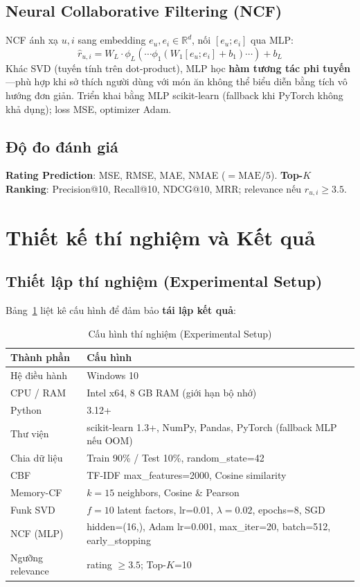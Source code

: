 \documentclass[11pt]{article}
\begin{document}
\subsection{Neural Collaborative Filtering (NCF)}
NCF ánh xạ $u, i$ sang embedding $e_u, e_i \in \mathbb{R}^d$, nối $[e_u; e_i]$ qua MLP:
\begin{equation}
    \hat{r}_{u,i} = W_L \cdot \phi_L(\cdots \phi_1(W_1 [e_u; e_i] + b_1) \cdots) + b_L
\end{equation}
Khác SVD (tuyến tính trên dot-product), MLP học \textbf{hàm tương tác phi tuyến}---phù hợp khi sở thích người dùng với món ăn không thể biểu diễn bằng tích vô hướng đơn giản. Triển khai bằng MLP scikit-learn (fallback khi PyTorch không khả dụng); loss MSE, optimizer Adam.

\subsection{Độ đo đánh giá}
\textbf{Rating Prediction}: MSE, RMSE, MAE, NMAE ($=\text{MAE}/5$). \textbf{Top-$K$ Ranking}: Precision@10, Recall@10, NDCG@10, MRR; relevance nếu $r_{u,i} \geq 3.5$.

\section{Thiết kế thí nghiệm và Kết quả}
\label{sec:exp}

\subsection{Thiết lập thí nghiệm (Experimental Setup)}
Bảng~\ref{tab:setup} liệt kê cấu hình để đảm bảo \textbf{tái lập kết quả}:

\begin{table}[t]
\centering
\caption{Cấu hình thí nghiệm (Experimental Setup)}
\label{tab:setup}
\small
\begin{tabular}{ll}
\toprule
\textbf{Thành phần} & \textbf{Cấu hình} \\
\midrule
Hệ điều hành & Windows 10 \\
CPU / RAM & Intel x64, 8 GB RAM (giới hạn bộ nhớ) \\
Python & 3.12+ \\
Thư viện & scikit-learn 1.3+, NumPy, Pandas, PyTorch (fallback MLP nếu OOM) \\
Chia dữ liệu & Train 90\% / Test 10\%, random\_state=42 \\
CBF & TF-IDF max\_features=2000, Cosine similarity \\
Memory-CF & $k=15$ neighbors, Cosine \& Pearson \\
Funk SVD & $f=10$ latent factors, lr=0.01, $\lambda=0.02$, epochs=8, SGD \\
NCF (MLP) & hidden=(16,), Adam lr=0.001, max\_iter=20, batch=512, early\_stopping \\
Ngưỡng relevance & rating $\geq 3.5$; Top-$K$=10 \\
\bottomrule
\end{tabular}
\end{table}
\end{document}
